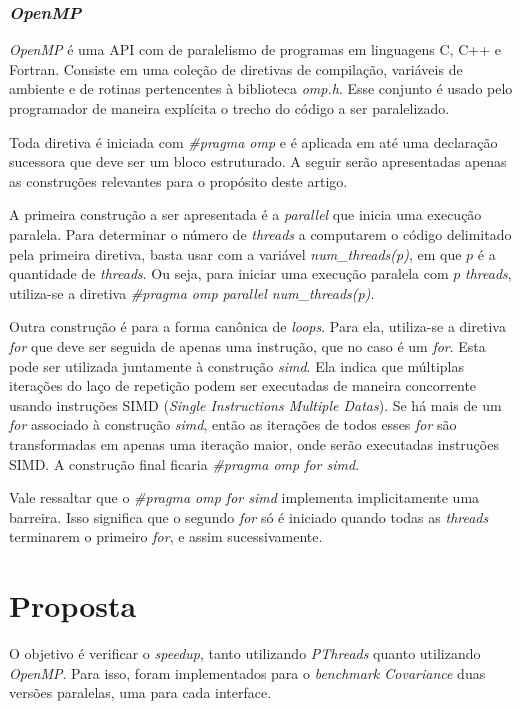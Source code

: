 \documentclass[12pt]{article}
\begin{document}
\subsubsection{\textit{OpenMP}} \label{sec:omp}

\textit{OpenMP} é uma API com de paralelismo de programas em linguagens C, C++ e Fortran. Consiste em uma coleção de diretivas de compilação, variáveis de ambiente e de rotinas pertencentes à biblioteca \textit{omp.h}. Esse conjunto é usado pelo programador de maneira explícita o trecho do código a ser paralelizado. 

Toda diretiva é iniciada com \textit{\#pragma omp} e é aplicada em até uma declaração sucessora que deve ser um bloco estruturado. A seguir serão apresentadas apenas as construções relevantes para o propósito deste artigo.

A primeira construção a ser apresentada é a \textit{parallel} que inicia uma execução paralela. Para determinar o número de \textit{threads} a computarem o código delimitado pela primeira diretiva, basta usar com a variável \textit{num\_threads(p)}, em que $p$ é a quantidade de \textit{threads}. Ou seja, para iniciar uma execução paralela com $p$ \textit{threads}, utiliza-se a diretiva \textit{\#pragma omp parallel num\_threads(p)}.

Outra construção é para a forma canônica de \textit{loops}. Para ela, utiliza-se a diretiva \textit{for} que deve ser seguida de apenas uma instrução, que no caso é um \textit{for}. Esta pode ser utilizada juntamente à construção \textit{simd}. Ela indica que múltiplas iterações do laço de repetição podem ser executadas de maneira concorrente usando instruções SIMD (\textit{Single Instructions Multiple Datas}). Se há mais de um \textit{for} associado à construção \textit{simd}, então as iterações de todos esses \textit{for} são transformadas em apenas uma iteração maior, onde serão executadas instruções SIMD. A construção final ficaria \textit{\#pragma omp for simd}.

Vale ressaltar que o \textit{\#pragma omp for simd} implementa implicitamente uma barreira. Isso significa que o segundo \textit{for} só é iniciado quando todas as \textit{threads} terminarem o primeiro \textit{for}, e assim sucessivamente.

\section{Proposta}

O objetivo é verificar o \textit{speedup}, tanto utilizando  \textit{PThreads} quanto utilizando \textit{OpenMP}. Para isso, foram implementados para o \textit{benchmark Covariance} duas versões paralelas, uma para cada interface.
\end{document}
